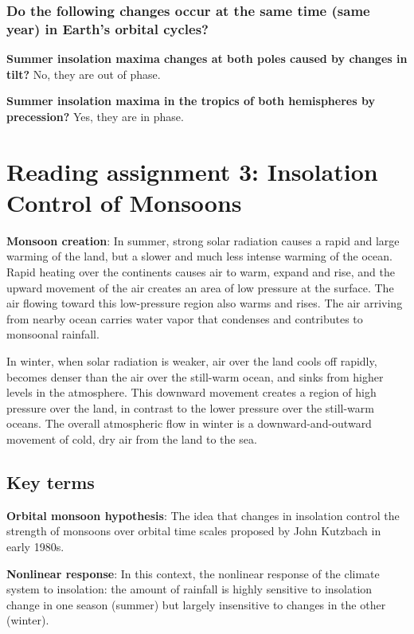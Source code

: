 \subsubsection{Do the following changes occur at the same time (same year) in
Earth's orbital cycles?}

\textbf{Summer insolation maxima changes at both poles caused by changes in
tilt?}
No, they are out of phase.

\textbf{Summer insolation maxima in the tropics of both hemispheres by
precession?}
Yes, they are in phase.

\section{Reading assignment 3: Insolation Control of Monsoons}

\textbf{Monsoon creation}: In summer, strong solar radiation causes a rapid and
large warming of the land, but a slower and much less intense warming of the
ocean. Rapid heating over the continents causes air to warm, expand and rise,
and the upward movement of the air creates an area of low pressure at the
surface. The air flowing toward this low-pressure region also warms and rises.
The air arriving from nearby ocean carries water vapor that condenses and
contributes to monsoonal rainfall.

In winter, when solar radiation is weaker, air over the land cools off rapidly,
becomes denser than the air over the still-warm ocean, and sinks from higher
levels in the atmosphere. This downward movement creates a region of high
pressure over the land, in contrast to the lower pressure over the still-warm
oceans. The overall atmospheric flow in winter is a downward-and-outward
movement of cold, dry air from the land to the sea.

\subsection{Key terms}

\textbf{Orbital monsoon hypothesis}: The idea that changes in insolation
control the strength of monsoons over orbital time scales proposed by John
Kutzbach in early 1980s.

\textbf{Nonlinear response}: In this context, the nonlinear response of the
climate system to insolation: the amount of rainfall is highly sensitive to
insolation change in one season (summer) but largely insensitive to changes
in the other (winter).

